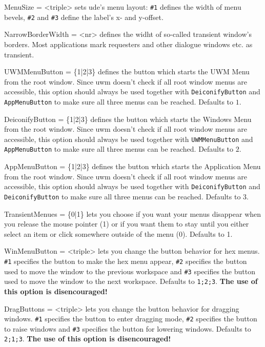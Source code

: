 \documentclass[10pt,a4paper]{article}
\newenvironment{ttdesc}[1]{
   \begin{list}{}{
          \renewcommand{\makelabel}[1]{\texttt{##1\hfill}}}}{\end{list}}
\begin{document}
\begin{ttdesc}{description}
\item[MenuSize = <triple>] sets ude's menu layout: \texttt{\#1} defines the width of menu bevels, \texttt{\#2} and \texttt{\#3} define the label's x- and y-offset.

\item[NarrowBorderWidth = <nr>] defines the widht of so-called transient window's borders. Most applications mark requesters and other dialogue windows etc. as transient.

\item[UWMMenuButton = \{1|2|3\}] defines the button which starts the \textsf{UWM Menu} from the root window. Since uwm doesn't check if all root window menus are accessible, this option should always be used together with \texttt{DeiconifyButton} and \texttt{AppMenuButton} to make sure all three menus can be reached. Defaults to $1$.  

\item[DeiconifyButton = \{1|2|3\}] defines the button which starts the \textsf{Windows Menu} from the root window. Since uwm doesn't check if all root window menus are accessible, this option should always be used together with \texttt{UWMMenuButton} and \texttt{AppMenuButton} to make sure all three menus can be reached. Defaults to $2$.

\item[AppMenuButton = \{1|2|3\}] defines the button which starts the \textsf{Application Menu} from the root window. Since uwm doesn't check if all root window menus are accessible, this option should always be used together with \texttt{DeiconifyButton} and \texttt{DeiconifyButton} to make sure all three menus can be reached. Defaults to $3$.

\item[TransientMenues = \{0|1\}] lets you choose if you want your menus disappear when you release the mouse pointer (1) or if you want them to stay until you either select an item or click somewhere outside of the menu (0). Defaults to 1.

\item[WinMenuButton = <triple>] lets you change the button behavior for hex menus. \texttt{\#1} specifies the button to make the hex menu appear, \texttt{\#2} specifies the button used to move the window to the previous workspace and \texttt{\#3} specifies the button used to move the window to the next workspace. Defaults to \texttt{1;2;3}. \textbf{The use of this option is disencouraged!}

\item[DragButtons = <triple>] lets you change the button behavior for dragging windows. \texttt{\#1} specifies the button to enter dragging mode, \texttt{\#2} specifies the button to raise windows and \texttt{\#3} specifies the button for lowering windows. Defaults to \texttt{2;1;3}. \textbf{The use of this option is disencouraged!}


\end{ttdesc}
\end{document}
